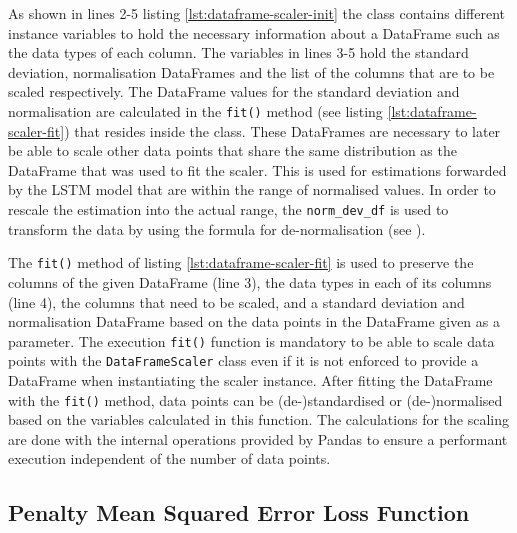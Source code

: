     

    As shown in lines 2-5 listing \ref{lst:dataframe-scaler-init} the class contains different instance variables to hold the necessary information about a DataFrame such as the data types of each column.
    The variables in lines 3-5 hold the standard deviation, normalisation DataFrames and the list of the columns that are to be scaled respectively. The DataFrame values for the standard deviation and normalisation are calculated in the \texttt{fit()} method (see listing \ref{lst:dataframe-scaler-fit}) that resides inside the class.
    These DataFrames are necessary to later be able to scale other data points that share the same distribution as the DataFrame that was used to fit the scaler. 
    This is used for estimations forwarded by the LSTM model that are within the range of normalised values.
    In order to rescale the estimation into the actual range, the \texttt{norm\_dev\_df} is used to transform the data by using the formula for de-normalisation (see ).

    
    The \texttt{fit()} method of listing \ref{lst:dataframe-scaler-fit} is used to preserve the columns of the given DataFrame (line 3), the data types in each of its columns (line 4), the columns that need to be scaled, and a standard deviation and normalisation DataFrame based on the data points in the DataFrame given as a parameter. The execution \texttt{fit()} function is mandatory to be able to scale data points with the \texttt{DataFrameScaler} class even if it is not enforced to provide a DataFrame when instantiating the scaler instance.
    After fitting the DataFrame with the \texttt{fit()} method, data points can be (de-)standardised or (de-)normalised based on the variables calculated in this function.
    The calculations for the scaling are done with the internal operations provided by Pandas to ensure a performant execution independent of the number of data points.


  \subsection{Penalty Mean Squared Error Loss Function}
  \label{sec:penalty-mse-loss-function-architecture-and-implementation}

